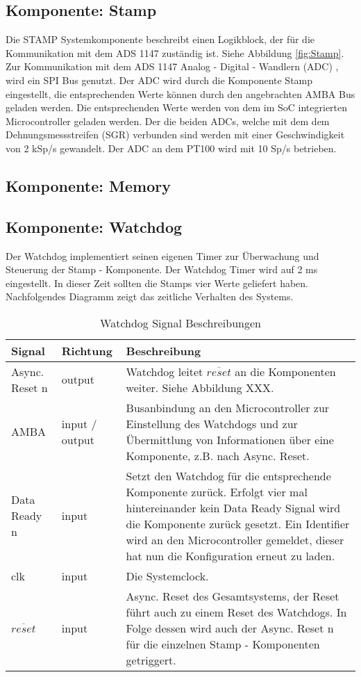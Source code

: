 \subsection{Komponente: Stamp}
\label{bes:Stamp}
Die STAMP Systemkomponente beschreibt einen Logikblock, der für die Kommunikation mit dem ADS 1147 zuständig ist. Siehe Abbildung \ref{fig:Stamp}. 
Zur Kommunikation mit dem ADS 1147 Analog - Digital - Wandlern (ADC) , wird ein SPI Bus genutzt. Der ADC wird durch die Komponente Stamp eingestellt, die entsprechenden Werte können durch den angebrachten AMBA Bus geladen werden. Die entsprechenden Werte werden von dem im SoC integrierten Microcontroller geladen werden. 
Der die beiden ADCs, welche mit dem dem Dehnungsmessstreifen (SGR) verbunden sind werden mit einer Geschwindigkeit von 2 kSp/s gewandelt. Der ADC an dem PT100 wird mit 10 Sp/s betrieben. 
\subsection{Komponente: Memory}
\label{bes:memory}
\subsection{Komponente: Watchdog}
Der Watchdog implementiert seinen eigenen Timer zur Überwachung und Steuerung der Stamp - Komponente. Der Watchdog Timer wird auf 2 ms eingestellt. In dieser Zeit sollten die Stamps vier Werte geliefert haben. Nachfolgendes Diagramm zeigt das zeitliche Verhalten des Systems. 
\renewcommand{\arraystretch}{1.5}
\begin{table}[htb]
  \begin{tabular}{|p{.3\linewidth}|p{.15\linewidth}|p{.45\linewidth}|}\hline
  \textbf{Signal} & \textbf{Richtung} & \textbf{Beschreibung} \\ \hline
  Async. Reset n & output & Watchdog leitet $\overline{reset}$ an die Komponenten weiter. Siehe Abbildung XXX. \\ \hline 
  AMBA & input / output & Busanbindung an den Microcontroller zur Einstellung des Watchdogs und zur Übermittlung von Informationen über eine Komponente, z.B. nach Async. Reset. \\ \hline
  Data Ready n & input & Setzt den Watchdog für die entsprechende Komponente zurück. Erfolgt vier mal hintereinander kein Data Ready Signal wird die Komponente zurück gesetzt. Ein Identifier wird an den Microcontroller gemeldet, dieser hat nun die Konfiguration erneut zu laden. \\ \hline
  clk & input & Die Systemclock. \\ \hline 
  $\overline{reset} $ & input & Async. Reset des Gesamtsystems, der Reset führt auch zu einem Reset des Watchdogs. In Folge dessen wird auch der Async. Reset n für die einzelnen Stamp  - Komponenten getriggert. \\ \hline
  \end{tabular}
   \caption{Watchdog Signal Beschreibungen}
\end{table}
\renewcommand{\arraystretch}{1.0}


